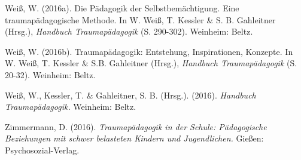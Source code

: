 \hang
Weiß, W. (2016a). Die Pädagogik der Selbstbemächtigung. Eine traumapädagogische Methode. In W. Weiß, T. Kessler \& S. B. Gahleitner (Hrsg.), \textit{Handbuch Traumapädagogik} (S. 290-302). Weinheim: Beltz.

\hang
Weiß, W. (2016b). Traumap{\"a}dagogik: Entstehung, Inspirationen, Konzepte. In W. Weiß, T. Kessler \& S.B. Gahleitner (Hrsg.), \textit{Handbuch Traumapädagogik} (S. 20-32). Weinheim: Beltz.

\hang
Weiß, W., Kessler, T. \& Gahleitner, S. B. (Hrsg.). (2016). \textit{Handbuch Traumapädagogik.} Weinheim: Beltz.

\hang
Zimmermann, D. (2016). \textit{Traumapädagogik in der Schule: Pädagogische Beziehungen mit schwer belasteten Kindern und Jugendlichen.} Gießen: Psychosozial-Verlag.
